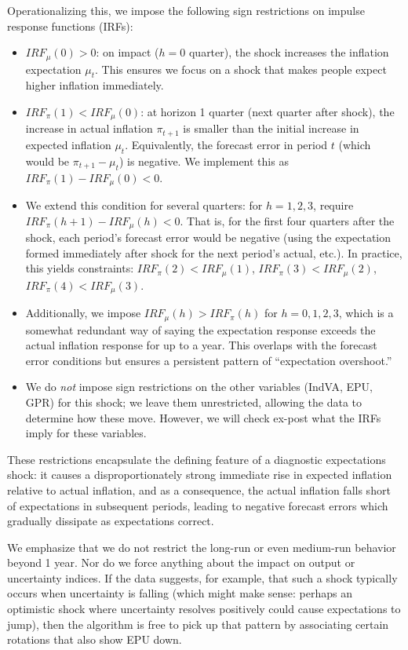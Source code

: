 \documentclass[12pt]{article}
\begin{document}
Operationalizing this, we impose the following sign restrictions on impulse response functions (IRFs):
\begin{itemize}
    \item $IRF_{\mu}(0) > 0$: on impact ($h=0$ quarter), the shock increases the inflation expectation $\mu_t$. This ensures we focus on a shock that makes people expect higher inflation immediately.
    \item $IRF_{\pi}(1) < IRF_{\mu}(0)$: at horizon 1 quarter (next quarter after shock), the increase in actual inflation $\pi_{t+1}$ is smaller than the initial increase in expected inflation $\mu_t$. Equivalently, the forecast error in period $t$ (which would be $\pi_{t+1} - \mu_t$) is negative. We implement this as $IRF_{\pi}(1) - IRF_{\mu}(0) < 0$.
    \item We extend this condition for several quarters: for $h = 1,2,3$, require $IRF_{\pi}(h+1) - IRF_{\mu}(h) < 0$. That is, for the first four quarters after the shock, each period's forecast error would be negative (using the expectation formed immediately after shock for the next period's actual, etc.). In practice, this yields constraints: $IRF_{\pi}(2) < IRF_{\mu}(1)$, $IRF_{\pi}(3) < IRF_{\mu}(2)$, $IRF_{\pi}(4) < IRF_{\mu}(3)$.
    \item Additionally, we impose $IRF_{\mu}(h) > IRF_{\pi}(h)$ for $h=0,1,2,3$, which is a somewhat redundant way of saying the expectation response exceeds the actual inflation response for up to a year. This overlaps with the forecast error conditions but ensures a persistent pattern of “expectation overshoot.”
    \item We do \textit{not} impose sign restrictions on the other variables (IndVA, EPU, GPR) for this shock; we leave them unrestricted, allowing the data to determine how these move. However, we will check ex-post what the IRFs imply for these variables.
\end{itemize}

These restrictions encapsulate the defining feature of a diagnostic expectations shock: it causes a disproportionately strong immediate rise in expected inflation relative to actual inflation, and as a consequence, the actual inflation falls short of expectations in subsequent periods, leading to negative forecast errors which gradually dissipate as expectations correct.

We emphasize that we do not restrict the long-run or even medium-run behavior beyond 1 year. Nor do we force anything about the impact on output or uncertainty indices. If the data suggests, for example, that such a shock typically occurs when uncertainty is falling (which might make sense: perhaps an optimistic shock where uncertainty resolves positively could cause expectations to jump), then the algorithm is free to pick up that pattern by associating certain rotations that also show EPU down.
\end{document}
